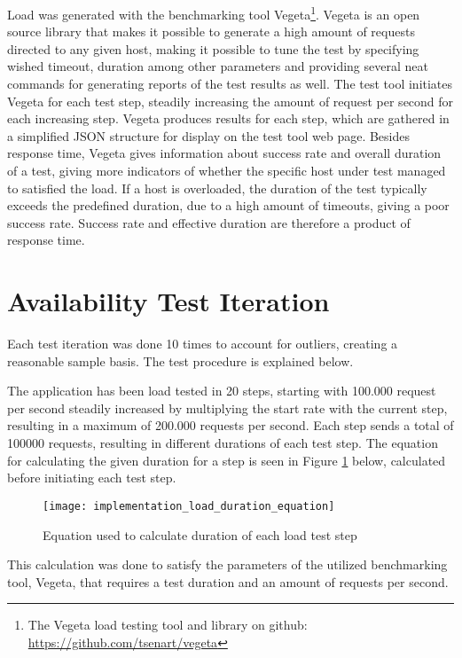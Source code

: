 Load was generated with the benchmarking tool Vegeta\footnote{The Vegeta load testing tool and library on github: \url{https://github.com/tsenart/vegeta}}. Vegeta is an open source library that makes it possible to generate a high amount of requests directed to any given host, making it possible to tune the test by specifying wished timeout, duration among other parameters and providing several neat commands for generating reports of the test results as well. The test tool initiates Vegeta for each test step, steadily increasing the amount of request per second for each increasing step. Vegeta produces results for each step, which are gathered in a simplified JSON structure for display on the test tool web page. Besides response time, Vegeta gives information about success rate and overall duration of a test, giving more indicators of whether the specific host under test managed to satisfied the load. If a host is overloaded, the duration of the test typically exceeds the predefined duration, due to a high amount of timeouts, giving a poor success rate. Success rate and effective duration are therefore a product of response time.

\section{Availability Test Iteration}
Each test iteration was done 10 times to account for outliers, creating a reasonable sample basis. The test procedure is explained below.

The application has been load tested in 20 steps, starting with 100.000 request per second steadily increased by multiplying the start rate with the current step, resulting in a maximum of 200.000 requests per second. Each step sends a total of 100000 requests, resulting in different durations of each test step. The equation for calculating the given duration for a step is seen in Figure \ref{fig:implementation_load_duration_equation} below, calculated before initiating each test step.

\begin{figure}[!htb]
  \texttt{[image: implementation\_load\_duration\_equation]}  
  \caption{Equation used to calculate duration of each load test step}
  \label{fig:implementation_load_duration_equation}
\end{figure}

This calculation was done to satisfy the parameters of the utilized benchmarking tool, Vegeta, that requires a test duration and an amount of requests per second.


